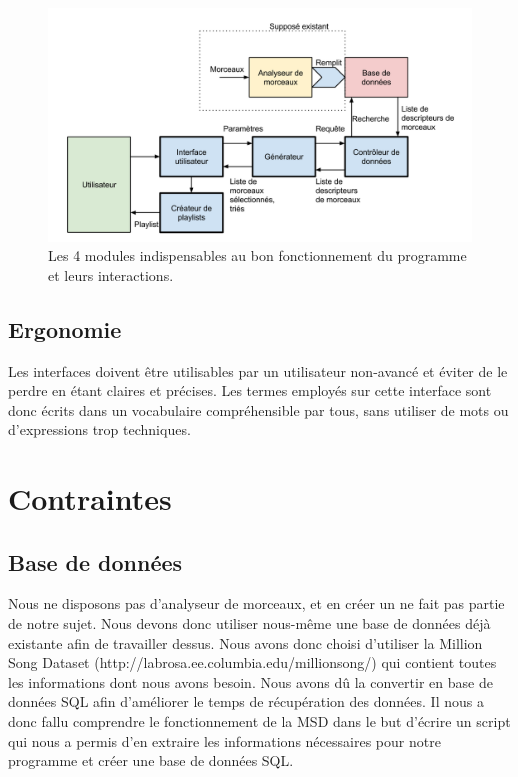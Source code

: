 \begin{figure}[H]
\includegraphics[width=\textwidth]{data/besoins/modules.png}
\caption{Les 4 modules indispensables au bon fonctionnement du programme et leurs
interactions.}
\end{figure}

\subsection{Ergonomie}
\label{besoins:nfonc:perf:erg}
Les interfaces doivent être utilisables par un utilisateur non-avancé et éviter 
de le perdre en étant claires et précises. Les termes employés sur cette 
interface sont donc écrits dans un vocabulaire compréhensible par tous, sans 
utiliser de mots ou d'expressions trop techniques.

\section{Contraintes}
\label{besoins:contraintes}

\subsection{Base de données}
\label{besoins:contraintes:bdd}
Nous ne disposons pas d’analyseur de morceaux, et en créer un ne fait pas partie
de notre sujet. Nous devons donc utiliser nous-même une base de données déjà
existante afin de travailler dessus. Nous avons donc choisi d’utiliser la Million
Song Dataset (http://labrosa.ee.columbia.edu/millionsong/) qui contient toutes
les informations dont nous avons besoin. Nous avons dû la convertir en base de 
données SQL afin d'améliorer le temps de récupération des données. Il nous a 
donc fallu comprendre le fonctionnement de la MSD dans le but d'écrire un 
script qui nous a permis d'en extraire les informations nécessaires pour notre 
programme et créer une base de données SQL.
    
